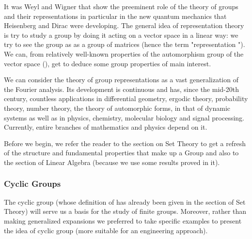 	It was Weyl and Wigner that show the preeminent role of the theory of groups and their representations in particular in the new quantum mechanics that Heisenberg  and Dirac were developing. The general idea of representation theory is try to study a group by doing it acting on a vector space in a linear way: we try to see the group as as a group of matrices (hence the term "representation "). We can, from relatively well-known properties of the automorphism group of the vector space (), get to deduce some group properties of main interest.
	
	We can consider the theory of group representations as a vast generalization of the Fourier analysis. Its development is continuous and has, since the mid-20th century, countless applications in differential geometry, ergodic theory, probability theory, number theory, the theory of automorphic forms, in that of dynamic systems as well as in physics, chemistry, molecular biology and signal processing. Currently, entire branches of mathematics and physics depend on it.
	
	Before we begin, we refer the reader to the section on Set Theory to get a refresh of the structure and fundamental properties that make up a Group and also to the section of Linear Algebra (because we use some results proved in it).
	
	\subsubsection{Cyclic Groups}\label{cyclic groups}
	The cyclic group (whose definition of has already been given in the section of Set Theory) will serve us a basis for the study of finite groups. Moreover, rather than making generalized expansions we preferred to take specific examples to present the idea of cyclic group (more suitable for an engineering approach).
	

